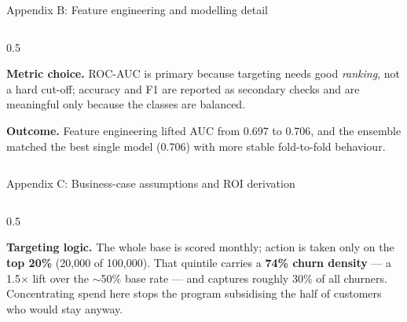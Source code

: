 \documentclass[aspectratio=169]{beamer}
\begin{document}
\begin{frame}{Appendix B: Feature engineering and modelling detail}
\begin{columns}[T]
\begin{column}{0.5\textwidth}
{        \medskip
        \textbf{Metric choice.} ROC-AUC is primary because targeting needs good
        \emph{ranking}, not a hard cut-off; accuracy and F1 are reported as
        secondary checks and are meaningful only because the classes are
        balanced.

        \medskip
        \textbf{Outcome.} Feature engineering lifted AUC from 0.697 to 0.706, and
        the ensemble matched the best single model (0.706) with more stable
        fold-to-fold behaviour.
        \par}
    \end{column}
    \end{columns}
\end{frame}

\begin{frame}{Appendix C: Business-case assumptions and ROI derivation}
    \begin{columns}[T]
    \begin{column}{0.5\textwidth}
        {\fontsize{5}{6}\selectfont
        \textbf{Targeting logic.} The whole base is scored monthly; action is
        taken only on the \textbf{top 20\%} (20{,}000 of 100{,}000). That
        quintile carries a \textbf{74\% churn density} --- a 1.5$\times$ lift over
        the $\sim$50\% base rate --- and captures roughly 30\% of all churners.
        Concentrating spend here stops the program subsidising the half of
        customers who would stay anyway.

}
\end{column}
\end{columns}
\end{frame}
\end{document}
